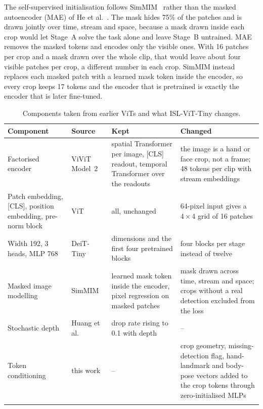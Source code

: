 \documentclass[pdflatex,sn-mathphys-num,onecolumn]{sn-jnl}
\newlength\origtw
\newenvironment{widetable}[1][tbp]{\begin{table}[#1]\centering\begin{minipage}{\origtw}\setlength\textwidth{\origtw}\setlength\columnwidth{\origtw}\begin{center}\begin{threeparttable}\tablebodyfont\renewcommand\footnotetext[2][]{{\removelastskip\vskip3pt\let\tablebodyfont\tablefootnotefont\hskip0pt\if!##1!\else{\smash{$^{##1}$}}\fi##2\par}}}{\end{threeparttable}\end{center}\end{minipage}\end{table}}
\theoremstyle{thmstyleone}%
\begin{document}
The self-supervised initialisation follows SimMIM~\cite{xie2022simmim} rather than the masked autoencoder (MAE) of He et al.~\cite{he2022mae}. The mask hides 75\% of the patches and is drawn jointly over time, stream and space, because a mask drawn inside each crop would let Stage~A solve the task alone and leave Stage~B untrained. MAE removes the masked tokens and encodes only the visible ones. With 16 patches per crop and a mask drawn over the whole clip, that would leave about four visible patches per crop, a different number in each crop. SimMIM instead replaces each masked patch with a learned mask token inside the encoder, so every crop keeps 17 tokens and the encoder that is pretrained is exactly the encoder that is later fine-tuned.

\begin{widetable}[!htbp]
\caption{Components taken from earlier ViTs and what ISL-ViT-Tiny changes.}\label{tab:borrow}
\scriptsize
\setlength{\tabcolsep}{3pt}
\begin{tabularx}{\textwidth}{@{}L{2.4cm}L{2.0cm}YY@{}}
\toprule
Component & Source & Kept & Changed \\
\midrule
Factorised encoder & ViViT Model~2~\cite{arnab2021vivit} & spatial Transformer per image, [CLS] readout, temporal Transformer over the readouts & the image is a hand or face crop, not a frame; 48 tokens per clip with stream embeddings \\\addlinespace[2.5pt]
Patch embedding, [CLS], position embedding, pre-norm block & ViT~\cite{dosovitskiy2021vit} & all, unchanged & 64-pixel input gives a $4\times4$ grid of 16 patches \\\addlinespace[2.5pt]
Width 192, 3 heads, MLP 768 & DeiT-Tiny~\cite{touvron2021deit} & dimensions and the first four pretrained blocks & four blocks per stage instead of twelve \\\addlinespace[2.5pt]
Masked image modelling & SimMIM~\cite{xie2022simmim} & learned mask token inside the encoder, pixel regression on masked patches & mask drawn across time, stream and space; crops without a real detection excluded from the loss \\\addlinespace[2.5pt]
Stochastic depth & Huang et al.~\cite{huang2016stochdepth} & drop rate rising to 0.1 with depth & -- \\\addlinespace[2.5pt]
Token conditioning & this work & -- & crop geometry, missing-detection flag, hand-landmark and body-pose vectors added to the crop tokens through zero-initialised MLPs \\
\botrule
\end{tabularx}
\end{widetable}
\end{document}
